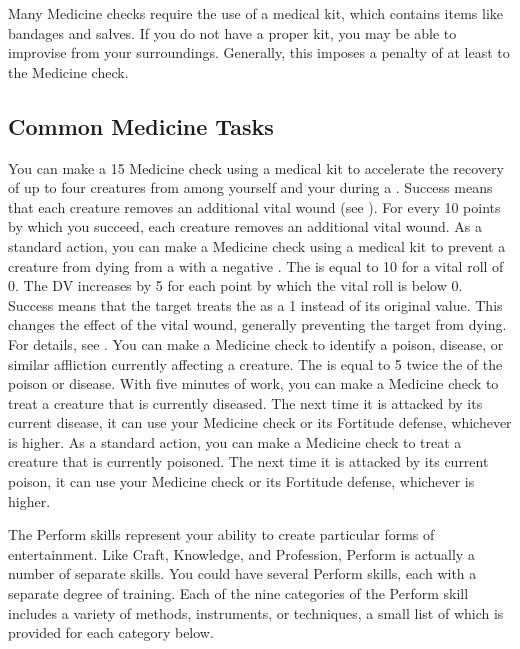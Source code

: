     Many Medicine checks require the use of a medical kit, which contains items like bandages and salves.
    If you do not have a proper kit, you may be able to improvise from your surroundings.
    Generally, this imposes a penalty of at least  to the Medicine check.

    \subsection{Common Medicine Tasks}
        \label{Accelerate Recovery}
            You can make a  15 Medicine check using a medical kit to accelerate the recovery of up to four creatures from among yourself and your  during a .
            Success means that each creature removes an additional vital wound (see ).
            For every 10 points by which you succeed, each creature removes an additional vital wound.
        \label{First Aid}
            As a standard action, you can make a Medicine check using a medical kit to prevent a creature from dying from a  with a negative .
            The  is equal to 10 for a vital roll of 0.
            The DV increases by 5 for each point by which the vital roll is below 0.
            Success means that the target treats the  as a 1 instead of its original value.
            This changes the effect of the vital wound, generally preventing the target from dying.
            For details, see .
        \label{Identify Affliction}
            You can make a Medicine check to identify a poison, disease, or similar affliction currently affecting a creature.
            The  is equal to 5 \add twice the  of the poison or disease.
         With five minutes of work, you can make a Medicine check to treat a creature that is currently diseased.
            The next time it is attacked by its current disease, it can use your Medicine check or its Fortitude defense, whichever is higher.
         As a standard action, you can make a Medicine check to treat a creature that is currently poisoned.
            The next time it is attacked by its current poison, it can use your Medicine check or its Fortitude defense, whichever is higher.

\newpage
{}
    The Perform skills represent your ability to create particular forms of entertainment.
        Like Craft, Knowledge, and Profession, Perform is actually a number of separate skills.
        You could have several Perform skills, each with a separate degree of training.
        Each of the nine categories of the Perform skill includes a variety of methods, instruments, or techniques, a small list of which is provided for each category below.

